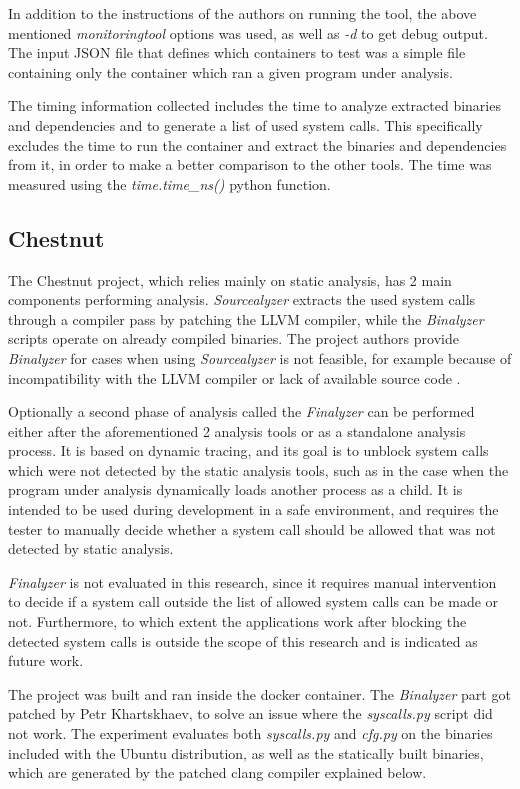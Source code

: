 In addition to the instructions of the authors on running the tool, the above mentioned \textit{monitoringtool} options was used, as well as \textit{-d} to get debug output.
The input JSON file that defines which containers to test was a simple file containing only the container which ran a given program under analysis.

The timing information collected includes the time to analyze extracted binaries and dependencies and to generate a list of used system calls. This specifically excludes the time to run the container and extract the binaries and dependencies from it, in order to make a better comparison to the other tools. The time was measured using the \textit{time.time\_ns()} python function.

\subsection {Chestnut}
The Chestnut \cite{ref_sp_1} project, which relies mainly on static analysis, has 2 main components performing analysis. \textit{Sourcealyzer} extracts the used system calls through a compiler pass by patching the LLVM compiler, while the \textit{Binalyzer} scripts operate on already compiled binaries. The project authors provide \textit{Binalyzer} for cases when using \textit{Sourcealyzer} is not feasible, for example because of incompatibility with the LLVM compiler or lack of available source code \cite{ref_sp_1}.

Optionally a second phase of analysis called the \textit{Finalyzer} can be performed either after the aforementioned 2 analysis tools or as a standalone analysis process.
It is based on dynamic tracing, and its goal is to unblock system calls which were not detected by the static analysis tools, such as in the case when the program under analysis dynamically loads another process as a child.
It is intended to be used during development in a safe environment, and requires the tester to manually decide whether a system call should be allowed that was not detected by static analysis.

\textit{Finalyzer} is not evaluated in this research, since it requires manual intervention to decide if a system call outside the list of allowed system calls can be made or not.
Furthermore, to which extent the applications work after blocking the detected system calls is outside the scope of this research and is indicated as future work.

The project was built and ran inside the docker container. The \textit{Binalyzer} part got patched by Petr Khartskhaev, to solve an issue where the \textit{syscalls.py} script did not work.
The experiment evaluates both \textit{syscalls.py} and \textit{cfg.py} on the binaries included with the Ubuntu distribution, as well as the statically built binaries, which are generated by the patched clang compiler explained below.

